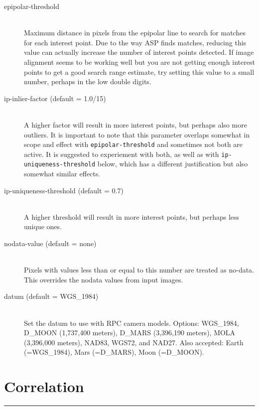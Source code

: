 \begin{description}
\item[epipolar-threshold]  \hfill \\
Maximum distance in pixels from the epipolar line to search for matches for each
interest point.  Due to the way ASP finds matches, reducing this value can actually
increase the number of interest points detected.  If image alignment seems to be working
well but you are not getting enough interest points to get a good search range estimate,
try setting this value to a small number, perhaps in the low double digits.

\item[ip-inlier-factor \textnormal (default = 1.0/15)] \hfill \\ A
higher factor will result in more interest points, but perhaps also
more outliers.  It is important to note that this parameter overlaps
somewhat in scope and effect with \texttt{epipolar-threshold} and
sometimes not both are active. It is suggested to experiement with both,
as well as with \texttt{ip-uniqueness-threshold} below, which has a
different justification but also somewhat similar effects.
 
\item[ip-uniqueness-threshold \textnormal (default = 0.7)] \hfill \\
A higher threshold will result in more interest points, but perhaps less unique ones.

\item[nodata-value \textnormal (default = none)] \hfill \\
Pixels with values less than or equal to this number are treated as
no-data. This overrides the nodata values from input images.

\item[datum \textnormal (default = WGS\_1984)] \hfill \\ Set the datum
to use with RPC camera models. Options: WGS\_1984, D\_MOON (1,737,400
meters), D\_MARS (3,396,190 meters), MOLA (3,396,000 meters), NAD83,
WGS72, and NAD27. Also accepted: Earth (=WGS\_1984), Mars (=D\_MARS), Moon
(=D\_MOON).

\end{description}



\section{Correlation}
\label{corr_section}
\hrule
\bigskip

